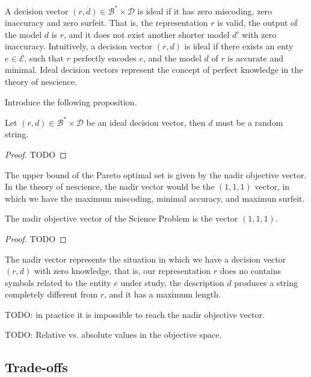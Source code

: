 A decision vector $(r, d) \in \mathcal{B}^\ast \times \mathcal{D}$ is ideal if it has zero miscoding, zero inaccuracy and zero surfeit. That is, the representation $r$ is {\color{red}valid}, the output of the model $d$ is $r$, and it does not exist another shorter model $d'$ with zero inaccuracy. Intuitively, a decision vector $(r, d)$ is ideal if there exists an enty $e \in \mathcal{E}$, such that $r$ perfectly encodes $e$, and the model $d$ of $r$ is accurate and minimal. Ideal decision vectors represent the concept of perfect knowledge in the theory of nescience.

{\color{red} Introduce the following proposition.}

\begin{proposition}
Let $(r, d) \in \mathcal{B}^\ast \times \mathcal{D}$ be an ideal decision vector, then $d$ must be a random string.
\end{proposition}
\begin{proof}
{\color{red} TODO}
\end{proof}

The upper bound of the Pareto optimal set is given by the nadir objective vector. In the theory of nescience, the nadir vector would be the $(1, 1, 1)$ vector, in which we have the maximum miscoding, minimal accuracy, and maximun surfeit.

\begin{proposition}
The nadir objective vector of the Science Problem is the vector $(1, 1, 1)$.
\end{proposition}
\begin{proof}
{\color{red} TODO}
\end{proof}

The nadir vector represents the situation in which we have a decision vector $(r, d)$ with zero knowledge, that is, our representation $r$ does no contains symbols related to the entity $e$ under study, the description $d$ produces a string completely different from $r$, and it has a maximum length.

\begin{example}
{\color{red} TODO: in practice it is impossible to reach the nadir objective vector.}
\end{example}

{\color{red} TODO: Relative vs. absolute values in the objective space.}


\subsection{Trade-offs}

